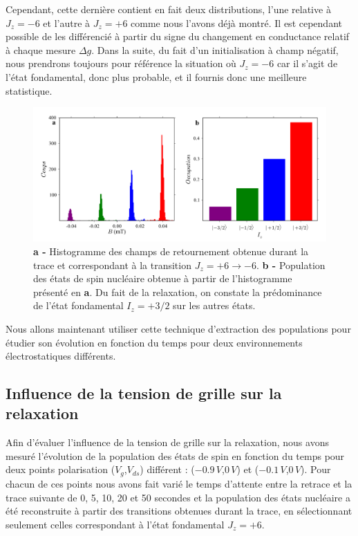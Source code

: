 Cependant, cette dernière contient en fait deux distributions, l'une relative à $J_z=-6$ et l'autre à $J_z=+6$ comme nous l'avons déjà montré. Il est cependant possible de les différencié à partir du signe du changement en conductance relatif à chaque mesure $\Delta g$. Dans la suite, du fait d'un initialisation à champ négatif, nous prendrons toujours pour référence la situation où $J_z=-6$ car il s'agit de l'état fondamental, donc plus probable, et il fournis donc une meilleure statistique.

\begin{figure}
\includegraphics[scale=0.45]{Resultats/PopState/PopState.pdf} 
\caption{\textbf{a -} Histogramme des champs de retournement obtenue durant la trace et correspondant à la transition $J_z = +6 \rightarrow -6$. \textbf{b -} Population des états de spin nucléaire obtenue à partir de l'histogramme présenté en \textbf{a}. Du fait de la relaxation, on constate la prédominance de l'état fondamental $I_z=+3/2$ sur les autres états.}
\label{extract_pop}
\end{figure}

Nous allons maintenant utiliser cette technique d'extraction des populations pour étudier son évolution en fonction du temps pour deux environnements électrostatiques différents.

\subsection{Influence de la tension de grille sur la relaxation}
Afin d'évaluer l'influence de la tension de grille sur la relaxation, nous avons mesuré l'évolution de la population des états de spin en fonction du temps pour deux points polarisation ($V_g$,$V_{ds}$) différent : ($-0.9\, V$,$0\, V$) et ($-0.1\, V$,$0\, V$). Pour chacun de ces points nous avons fait varié le temps d'attente entre la retrace et la trace suivante de 0, 5, 10, 20 et 50 secondes et la population des états nucléaire a été reconstruite à partir des transitions obtenues durant la trace, en sélectionnant seulement celles correspondant à l'état fondamental $J_z=+6$.

